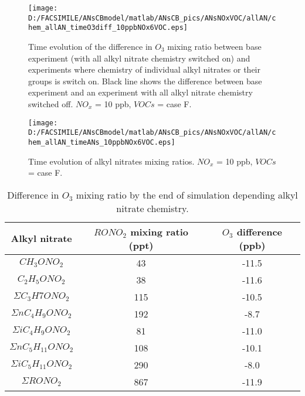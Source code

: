 \documentclass[11pt,a4paper]{article}
\begin{document}
\begin{figure}
\centering
\texttt{[image: D:/FACSIMILE/ANsCBmodel/matlab/ANsCB\_pics/ANsNOxVOC/allAN/chem\_allAN\_timeO3diff\_10ppbNOx6VOC.eps]}
\caption{Time evolution of the difference in $O_3$ mixing ratio between base experiment (with all alkyl nitrate chemistry switched on) and experiments where chemistry of individual alkyl nitrates or their groups is switch on. Black line shows the difference between base experiment and an experiment with all alkyl nitrate chemistry switched off. $NO_x$ = 10 ppb, $VOCs$ = case F.}\label{fig:timeO3diff10ppbNOx6VOC}
\end{figure}
\begin{figure}
\centering
\texttt{[image: D:/FACSIMILE/ANsCBmodel/matlab/ANsCB\_pics/ANsNOxVOC/allAN/chem\_allAN\_timeANs\_10ppbNOx6VOC.eps]}
\caption{Time evolution of alkyl nitrates mixing ratios. $NO_x$ = 10 ppb, $VOCs$ = case F.}\label{fig:timeANs10ppbNOx6VOC}
\end{figure}
\begin{table}
\caption{Difference in $O_3$ mixing ratio by the end of simulation depending alkyl nitrate chemistry.}\label{tab:timeO3diffANs10ppbNOx6VOC}
\begin{tabular}{ccc}
\hline
Alkyl nitrate            & $RONO_2$ mixing ratio (ppt) & $O_3$ difference (ppb) \\
\hline
$CH_3ONO_2$              & 43  & -11.5 \\
$C_2H_5ONO_2$            & 38  & -11.6 \\
$\Sigma C_3H7ONO_2$      & 115 & -10.5 \\
$\Sigma nC_4H_9ONO_2$    & 192 & -8.7  \\
$\Sigma iC_4H_9ONO_2$    & 81  & -11.0 \\
$\Sigma nC_5H_{11}ONO_2$ & 108 & -10.1 \\
$\Sigma iC_5H_{11}ONO_2$ & 290 & -8.0  \\
$\Sigma RONO_2$          & 867 & -11.9 \\
\hline
\end{tabular}
\end{table}
\end{document}
